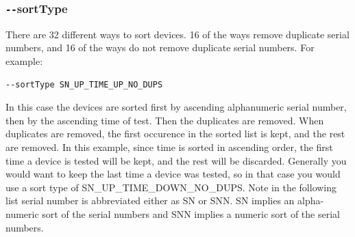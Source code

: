 \documentclass[letterpaper]{article}
\begin{document}
\subsubsection{\bf \texttt{-{}-}sortType}
There are 32 different ways to sort devices. 16 of the ways remove duplicate
serial numbers, and 16 of the ways do not remove duplicate serial numbers.
For example:
\begin{verbatim}
--sortType SN_UP_TIME_UP_NO_DUPS
\end{verbatim}
In this case the devices are sorted first by ascending alphanumeric serial number,
then by the ascending time of test.  Then the duplicates are removed.  When duplicates
are removed, the first occurence in the sorted list is kept, and the rest
are removed.  In this example, since time is sorted in ascending order,
the first time a device is tested will be kept, and the rest will be discarded.
Generally you would want to keep the last time a device was tested, so
in that case you would use a sort type of SN\_UP\_TIME\_DOWN\_NO\_DUPS.
Note in the following list serial number is abbreviated either as SN
or SNN. SN implies an alpha-numeric sort of the serial numbers and
SNN implies a numeric sort of the serial numbers.
\end{document}
